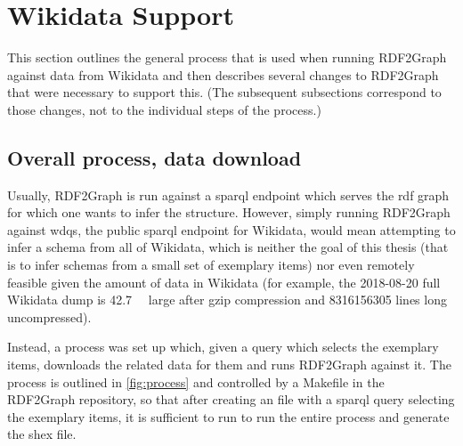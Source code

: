 \section{Wikidata Support}
\label{sec:RDF2Graph+Wikidata:Wikidata}

This section outlines the general process that is used when running \gls{RDF2Graph} against data from \gls{Wikidata}
and then describes several changes to \gls{RDF2Graph} that were necessary to support this.
(The subsequent subsections correspond to those changes, not to the individual steps of the process.)

\subsection{Overall process, data download}
\label{subsec:RDF2Graph+Wikidata:Wikidata:download}

Usually, \gls{RDF2Graph} is run against a \gls{sparql} endpoint
which serves the \gls{rdf} graph for which one wants to infer the structure.
However, simply running \gls{RDF2Graph} against \acrfull{wdqs}, the public \gls{sparql} endpoint for \gls{Wikidata},
would mean attempting to infer a \gls{schema} from all of \gls{Wikidata},
which is neither the goal of this thesis
(that is to infer \glspl{schema} from a small set of exemplary \glspl{item})
nor even remotely feasible given the amount of data in \gls{Wikidata}
(for example, the 2018-08-20 full \gls{Wikidata} dump is \SI{42.7}{\giga\byte} large after gzip compression %
and \num{8316156305} lines long uncompressed).

Instead, a process was set up which,
given a query which selects the exemplary \glspl{item},
downloads the related data for them and runs \gls{RDF2Graph} against it.
The process is outlined in \cref{fig:process}
and controlled by a Makefile in the \gls{RDF2Graph} repository,
so that after creating an  file
with a \gls{sparql} query selecting the exemplary items,
it is sufficient to run 
to run the entire process and generate the \gls{shex} file.

